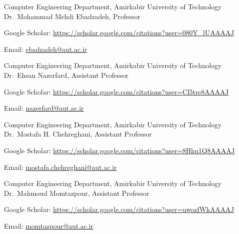 \begin{cventries}
  \cventry
    {Computer Engineering Department, Amirkabir University of Technology} %
    {Dr.~Mohammad Mehdi Ebadzadeh, Professor} %
    {} %
    {} %
    {
      \begin{cvitems} %
        \item {Google Scholar: \href{https://scholar.google.com/citations?user=080Y\_lUAAAAJ&hl=en}{https://scholar.google.com/citations?user=080Y\_lUAAAAJ}}
        \item {Email: \href{mailto:ebadzadeh@aut.ac.ir}{ebadzadeh@aut.ac.ir}}
      \end{cvitems}
    }

  \cventry
    {Computer Engineering Department, Amirkabir University of Technology} %
    {Dr.~Ehsan Nazerfard, Assistant Professor} %
    {} %
    {} %
    {
      \begin{cvitems} %
        \item {Google Scholar: \href{https://scholar.google.com/citations?user=Cl5tre8AAAAJ&hl=en}{https://scholar.google.com/citations?user=Cl5tre8AAAAJ}}
        \item {Email: \href{mailto:nazerfard@aut.ac.ir}{nazerfard@aut.ac.ir}}
      \end{cvitems}
    }

  \cventry
    {Computer Engineering Department, Amirkabir University of Technology} %
    {Dr.~Mostafa H. Chehreghani, Assistant Professor} %
    {} %
    {} %
    {
      \begin{cvitems} %
        \item {Google Scholar: \href{https://scholar.google.com/citations?user=8Hhu1Q8AAAAJ&hl=en}{https://scholar.google.com/citations?user=8Hhu1Q8AAAAJ}}
        \item {Email: \href{mailto:mostafa.chehreghani@aut.ac.ir}{mostafa.chehreghani@aut.ac.ir}}
      \end{cvitems}
    }

  \cventry
    {Computer Engineering Department, Amirkabir University of Technology} %
    {Dr.~Mahmoud Momtazpour, Assistant Professor} %
    {} %
    {} %
    {
      \begin{cvitems} %
        \item {Google Scholar: \href{https://scholar.google.com/citations?user=uwozfWkAAAAJ&hl=en}{https://scholar.google.com/citations?user=uwozfWkAAAAJ}}
        \item {Email: \href{mailto:momtazpour@aut.ac.ir}{momtazpour@aut.ac.ir}}
      \end{cvitems}
    }


\end{cventries}
